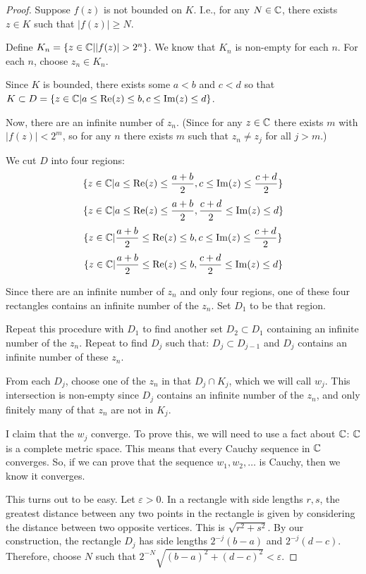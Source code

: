 \begin{proof}
Suppose $f(z)$ is not bounded on $K$. I.e., for any $N\in \mathbb{C}$, there exists $z\in K$ such that $|f(z)| \ge N$.

Define $K_{n} = \{z\in \mathbb{C}| |f(z)| > 2^n\}$. We know that $K_{n}$ is non-empty for each $n$. For each $n$, choose $z_n\in K_n$.

Since $K$ is bounded, there exists some $a < b$ and $c < d$ so that $K\subset D = \{z\in \mathbb{C}| a \le \operatorname{Re}(z) \le b, c \le \operatorname{Im}(z) \le d\}$.

Now, there are an infinite number of $z_n$. (Since for any $z\in \mathbb{C}$ there exists $m$ with $|f(z)| < 2^m$, so for any $n$ there exists $m$ such that $z_n \ne z_j$ for all $j > m$.) 

We cut $D$ into four regions: 
$$\{z\in \mathbb{C}| a \le \operatorname{Re}(z) \le \frac{a+b}{2}, c \le \operatorname{Im}(z) \le \frac{c+d}{2}\}$$
$$\{z\in \mathbb{C}| a \le \operatorname{Re}(z) \le \frac{a+b}{2}, \frac{c+d}{2} \le \operatorname{Im}(z) \le d\}$$
$$\{z\in \mathbb{C}| \frac{a+b}{2} \le \operatorname{Re}(z) \le b, c \le \operatorname{Im}(z) \le \frac{c+d}{2}\}$$
$$\{z\in \mathbb{C}| \frac{a+b}{2} \le \operatorname{Re}(z) \le b, \frac{c+d}{2} \le \operatorname{Im}(z) \le d\}$$

Since there are an infinite number of $z_n$ and only four regions, one of these four rectangles contains an infinite number of the $z_n$. Set $D_1$ to be that region.

Repeat this procedure with $D_1$ to find another set $D_2 \subset D_1$ containing an infinite number of the $z_n$. Repeat to find $D_j$ such that: $D_j \subset D_{j-1}$ and $D_j$ contains an infinite number of these $z_n$.

From each $D_j$, choose one of the $z_n$ in that $D_j \cap K_j$, which we will call $w_j$. This intersection is non-empty since $D_j$ contains an infinite number of the $z_n$, and only finitely many of that $z_n$ are not in $K_j$.

I claim that the $w_j$ converge. To prove this, we will need to use a fact about $\mathbb{C}$: $\mathbb{C}$ is a complete metric space. This means that every Cauchy sequence in $\mathbb{C}$ converges. So, if we can prove that the sequence $w_1,w_2,\dots$ is Cauchy, then we know it converges.

This turns out to be easy. Let $\varepsilon > 0$. In a rectangle with side lengths $r,s$, the greatest distance between any two points in the rectangle is given by considering the distance between two opposite vertices. This is $\sqrt{r^2 + s^2}$. By our construction, the rectangle $D_j$ has side lengths $2^{-j}(b-a)$ and $2^{-j}(d-c)$. Therefore, choose $N$ such that $2^{-N}\sqrt{(b-a)^2 + (d-c)^2} < \varepsilon$.


\end{proof}
